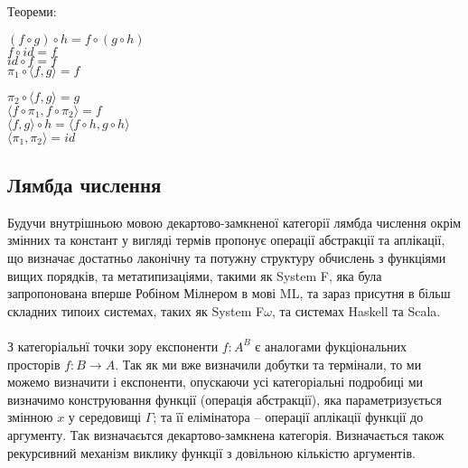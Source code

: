     Теореми:
\begin{fullwidth}[width=\linewidth+2cm]
\parbox[t][][l]{0.5\textwidth}{
$(f \circ g) \circ h = f \circ (g \circ h)$\\
$f \circ id = f$\\
$id \circ f = f$\\
$\pi_1 \circ \langle f, g \rangle = f$
}
\vspace{-1cm}
\parbox[t][][r]{0.4\textwidth}{
$\pi_2 \circ \langle f, g \rangle = g$\\
$\langle f \circ \pi_1, f \circ \pi_2 \rangle = f$\\
$\langle f, g \rangle \circ h = \langle f \circ h, g \circ h \rangle$\\
$\langle \pi_1, \pi_2 \rangle = id$
}
\end{fullwidth}

\newpage

\subsection{Лямбда числення}
Будучи внутрішньою мовою декартово-замкненої категорії лямбда числення окрім змінних
та констант у вигляді термів пропонує операції абстракції та аплікації, що визначає
достатньо лаконічну та потужну структуру обчислень з функціями вищих порядків,
та метатипизаціями, такими як System F, яка була запропонована
вперше Робіном Мілнером в мові ML, та зараз присутня в більш складних типоих системах,
таких як System F$\omega$, та системах Haskell та Scala.

\paragraph{}
З категоріальнї точки зору експоненти $f : A^B$ є аналогами
фукціональних просторів $f: B \rightarrow A$.
Так як ми вже визначили добутки та термінали, то ми можемо визначити і експоненти,
опускаючи усі категоріальні подробиці ми визначимо конструювання функції (операція абстракції),
яка параметризується змінною $x$ у середовищі $\Gamma$; та її елімінатора -- операції аплікації
функції до аргументу. Так визначаєьтся декартово-замкнена категорія.
Визначається також рекурсивний механізм виклику функції
з довільною кількістю аргументів.


